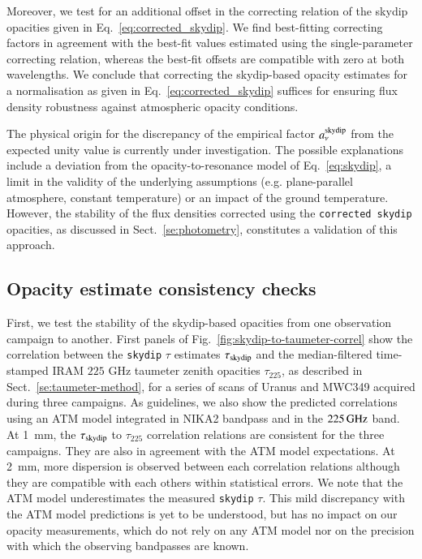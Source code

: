 Moreover, we test for an additional offset in the
correcting relation of the skydip opacities given in
Eq.~\ref{eq:corrected_skydip}. We find best-fitting correcting factors
in agreement with the best-fit values estimated using the single-parameter
correcting relation, whereas the best-fit offsets are compatible with
zero at both wavelengths. We conclude that correcting the skydip-based
opacity estimates for a normalisation as given in
Eq.~\ref{eq:corrected_skydip} suffices for ensuring flux density
robustness against atmospheric opacity conditions.

The physical origin for the discrepancy of the empirical factor
$a_\nu^{\rm{skydip}}$ from the expected unity value is currently
under investigation. The possible explanations include a deviation
from the opacity-to-resonance model of Eq.~\ref{eq:skydip}, a limit in the
validity of the underlying assumptions (e.g. plane-parallel atmosphere,
constant temperature) or an impact of the ground temperature. However,
the stability of the flux densities corrected using the
{\tt corrected skydip} opacities, as discussed in
Sect.~\ref{se:photometry}, constitutes a validation of this approach.

\subsection{Opacity estimate consistency checks}
\label{se:opacity_tests}

First, we test the stability of the skydip-based opacities from one
observation campaign to
another. First panels of Fig.~\ref{fig:skydip-to-taumeter-correl} show the
correlation between the {\tt skydip} $\tau$ estimates $\tau_{\rm{skydip}}$
and the median-filtered time-stamped IRAM $225$ GHz taumeter 
zenith opacities $\tau_{225}$, as described in
Sect.~\ref{se:taumeter-method}, for a series of scans
of Uranus and MWC349 acquired during three campaigns. As guidelines,
we also show the predicted correlations using an ATM model integrated
in NIKA2 bandpass and in the $225\,\rm{GHz}$ band. At 1~mm, the
$\tau_{\rm{skydip}}$ to $\tau_{225}$ correlation relations are
consistent for the three campaigns. They are
also in agreement with the ATM model expectations. At 2~mm, more
dispersion is observed between each correlation relations although
they are compatible with each others within statistical errors.
We note that the ATM model underestimates the
measured {\tt skydip} $\tau$. This mild discrepancy with the
ATM model predictions is yet to be understood, but has no impact on
our opacity measurements, which do not rely on any ATM model nor on
the precision with which the observing bandpasses are known.

